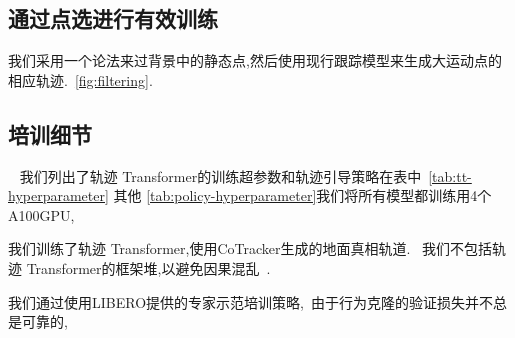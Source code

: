 \documentclass[conference]{IEEEtran}
\begin{document}
\subsection{通过点选进行有效训练}\label{sec:app:track-filter}
我们采用一个论法来过背景中的静态点,然后使用现行跟踪模型来生成大运动点的相应轨迹.~\ref{fig:filtering}.


\subsection{培训细节}~\label{sec:app:train-detail}
我们列出了轨迹 Transformer的训练超参数和轨迹引导策略在表中~\ref{tab:tt-hyperparameter} 其他 \ref{tab:policy-hyperparameter}我们将所有模型都训练用4个A100GPU,

我们训练了轨迹 Transformer,使用CoTracker生成的地面真相轨道.~\cite{karaev2023cotracker} 我们不包括轨迹 Transformer的框架堆,以避免因果混乱~\cite{wen2022primenet}. 

我们通过使用LIBERO提供的专家示范培训策略,~\cite{liu2023libero}由于行为克隆的验证损失并不总是可靠的,
\end{document}
